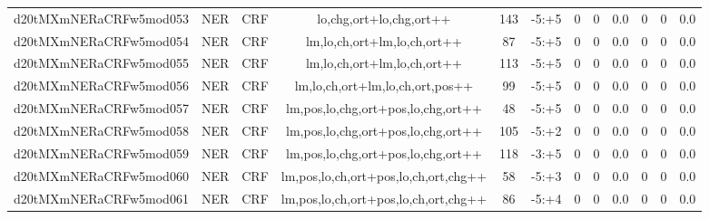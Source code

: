 \documentclass[a4paper]{article}
\begin{document}
\begin{landscape}
\begin{center}
\begin{tabular}{ |c|c|c|c|c|c|c|c|c|c|c|c|}
 
 	
 	\small{ d20tMXmNERaCRFw5mod053 } & \small{ NER} & \small{  CRF }  & lo,chg,ort+lo,chg,ort++  &  143 &  \small{  -5:+5 }  &  0 & 0 & 0.0  &  0 & 0 & 0.0 \\
 	

 
 	
 	\small{ d20tMXmNERaCRFw5mod054 } & \small{ NER} & \small{  CRF }  & lm,lo,ch,ort+lm,lo,ch,ort++  &  87 &  \small{  -5:+5 }  &  0 & 0 & 0.0  &  0 & 0 & 0.0 \\
 	

 
 	
 	\small{ d20tMXmNERaCRFw5mod055 } & \small{ NER} & \small{  CRF }  & lm,lo,ch,ort+lm,lo,ch,ort++  &  113 &  \small{  -5:+5 }  &  0 & 0 & 0.0  &  0 & 0 & 0.0 \\
 	

 
 	
 	\small{ d20tMXmNERaCRFw5mod056 } & \small{ NER} & \small{  CRF }  & lm,lo,ch,ort+lm,lo,ch,ort,pos++  &  99 &  \small{  -5:+5 }  &  0 & 0 & 0.0  &  0 & 0 & 0.0 \\
 	

 
 	
 	\small{ d20tMXmNERaCRFw5mod057 } & \small{ NER} & \small{  CRF }  & lm,pos,lo,chg,ort+pos,lo,chg,ort++  &  48 &  \small{  -5:+5 }  &  0 & 0 & 0.0  &  0 & 0 & 0.0 \\
 	

 
 	
 	\small{ d20tMXmNERaCRFw5mod058 } & \small{ NER} & \small{  CRF }  & lm,pos,lo,chg,ort+pos,lo,chg,ort++  &  105 &  \small{  -5:+2 }  &  0 & 0 & 0.0  &  0 & 0 & 0.0 \\
 	

 
 	
 	\small{ d20tMXmNERaCRFw5mod059 } & \small{ NER} & \small{  CRF }  & lm,pos,lo,chg,ort+pos,lo,chg,ort++  &  118 &  \small{  -3:+5 }  &  0 & 0 & 0.0  &  0 & 0 & 0.0 \\
 	

 
 	
 	\small{ d20tMXmNERaCRFw5mod060 } & \small{ NER} & \small{  CRF }  & lm,pos,lo,ch,ort+pos,lo,ch,ort,chg++  &  58 &  \small{  -5:+3 }  &  0 & 0 & 0.0  &  0 & 0 & 0.0 \\
 	

 
 	
 	\small{ d20tMXmNERaCRFw5mod061 } & \small{ NER} & \small{  CRF }  & lm,pos,lo,ch,ort+pos,lo,ch,ort,chg++  &  86 &  \small{  -5:+4 }  &  0 & 0 & 0.0  &  0 & 0 & 0.0 \\
 	


\end{tabular}
\end{center}
\end{landscape}
\end{document}
